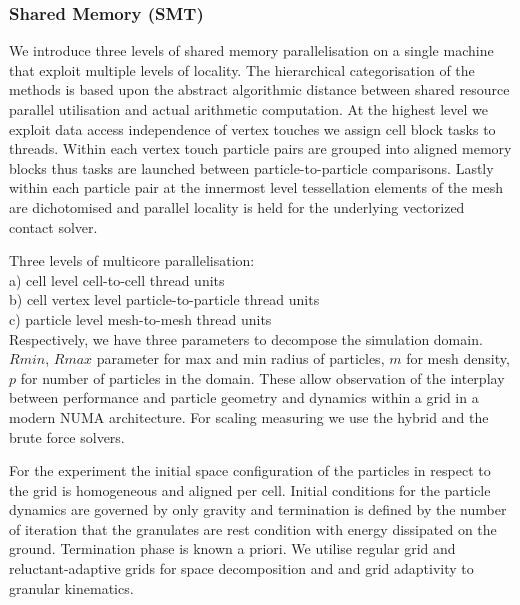 \documentclass[times,12pt]{article}
\begin{document}
\subsubsection{Shared Memory (SMT)}

We introduce three levels of shared memory parallelisation on a single machine that exploit multiple levels of locality. The hierarchical categorisation of the methods is based upon the abstract algorithmic distance between shared resource parallel utilisation and actual arithmetic computation. At the highest level we exploit  data access independence of vertex touches we assign cell block tasks to threads. Within each vertex touch particle pairs are grouped into aligned memory blocks thus tasks are launched between particle-to-particle comparisons. Lastly within each particle pair at the innermost level tessellation elements of the mesh are dichotomised and parallel locality is held for the underlying vectorized contact solver.

Three levels of multicore parallelisation:\\

a) cell level cell-to-cell thread units\\

b) cell vertex level particle-to-particle thread units\\

c) particle level mesh-to-mesh thread units\\

Respectively, we have three parameters to decompose the simulation domain. $Rmin$, $Rmax$ parameter for max and min radius of particles, $m$ for mesh density, $p$ for number of particles in the domain. These allow observation of the interplay between performance and particle geometry and dynamics within a grid in a modern NUMA architecture. For scaling measuring we use the hybrid and the brute force solvers.

For the experiment the initial space configuration of the particles in respect to the grid is homogeneous and aligned per cell. Initial conditions for the particle dynamics are governed by only gravity and termination is defined by the number of iteration that the granulates are rest condition with energy dissipated on the ground. Termination phase is known a priori. We utilise regular grid and reluctant-adaptive grids for space decomposition and and grid adaptivity to granular kinematics. 
\end{document}
